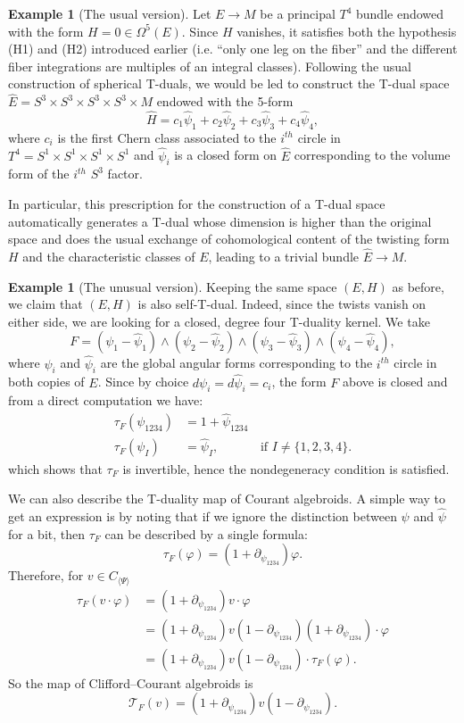 \documentclass[12pt,twoside]{article}
\theoremstyle{plain}
\theoremstyle{definition}
\newtheorem{example}[theorem]{Example}
\newcommand{\gf}{\text{$\varphi$}}
\newcommand{\del}{\text{$\partial$}}
\newcommand{\mc}[1]{\text{$\mathcal{#1}$}}
\newcommand{\IP}[1]{\langle #1 \rangle}
\numberwithin{equation}{section}
\begin{document}
\begin{example}[The usual version]
Let $E\to M$ be a principal $T^4$ bundle endowed with the form $H = 0 \in \Omega^5(E)$. Since $H$ vanishes, it satisfies both the hypothesis (H1) and (H2) introduced earlier (i.e. ``only one leg on the fiber'' and the different fiber integrations are multiples of an integral classes). Following the usual construction of spherical T-duals, we would be led to construct the T-dual space $\hat{E} = S^3 \times S^3 \times S^3 \times S^3 \times M$ endowed with the 5-form
\[\hat{H} = c_1 \hat{\psi}_1+c_2 \hat{\psi}_2+c_3 \hat{\psi}_3+c_4 \hat{\psi}_4,\]
where $c_i$ is the first Chern class associated to the $i^{th}$ circle in $T^4 = S^1 \times S^1\times S^1\times S^1$  and $\hat{\psi}_i$ is a closed form on $\hat{E}$ corresponding to the volume form of the $i^{th}$ $S^3$ factor.

In particular, this prescription for the construction of a T-dual space automatically generates a T-dual whose dimension is higher than the original space and does the usual exchange of cohomological content of the twisting form $H$ and the characteristic classes of $E$, leading to a trivial bundle $\hat{E}\to M$.
\end{example} 

\begin{example}[The unusual version]\label{ex:identitiy?}
Keeping the same space $(E,H)$ as before, we claim that $(E,H)$ is also self-T-dual. Indeed, since the twists vanish on either side, we are looking for a closed, degree four T-duality kernel. We take
\[F = (\psi_1-\hat{\psi}_1)\wedge(\psi_2-\hat{\psi}_2)\wedge(\psi_3-\hat{\psi}_3)\wedge(\psi_4-\hat{\psi}_4),\]
where $\psi_i$ and $\hat{\psi}_i$ are the global angular forms corresponding to the $i^{th}$ circle in both copies of $E$. Since by choice $d\psi_i = d\hat\psi_i = c_i$, the form $F$ above is closed and  from a direct computation we have:
\begin{align*}
 \tau_F (\psi_{1234}) &= 1 + \hat{\psi}_{1234}\\
 \tau_F (\psi_I)&= \hat\psi_I, \quad \quad\quad\mbox{ if } I \neq \{1,2,3,4\}.
 \end{align*}
which shows that $\tau_F$ is invertible, hence the nondegeneracy condition is satisfied. 

We can also describe the T-duality map of Courant algebroids. A simple way to get an expression is by noting that if we ignore the distinction between $\psi$ and $\hat\psi$ for a bit, then $\tau_F$ can be described by a single formula:
\[ \tau_F (\gf)= (1 + \del_{\psi_{1234}})\gf.\]
Therefore, for $v \in C_{\IP{\Psi}}$
\begin{align*}
 \tau_F (v\cdot\gf)&= (1 + \del_{\psi_{1234}})v \cdot \gf\\
 &=  (1 + \del_{\psi_{1234}})v (1 -\del_{\psi_{1234}})(1 + \del_{\psi_{1234}})\cdot \gf\\
 & =  (1 + \del_{\psi_{1234}})v (1 -\del_{\psi_{1234}}) \cdot \tau_F(\gf).
 \end{align*}
So the map of Clifford--Courant algebroids is 
\[\mc{T}_F(v) =  (1 +\del_{\psi_{1234}})v (1  -\del_{\psi_{1234}}).\] 
\end{example}




\end{document}

